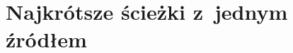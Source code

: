 \chapter{Najkrótsze ścieżki z~jednym źródłem}

\makeatletter
{}
\makeatother







\problems







